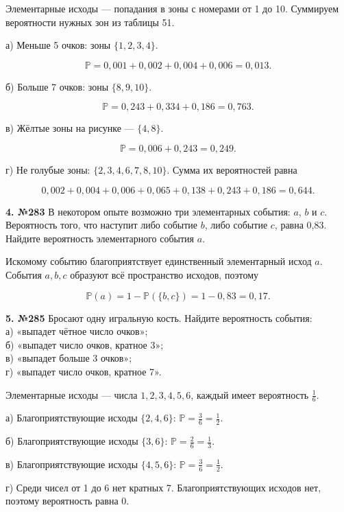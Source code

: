 \begin{solution}\label{solution-addition-of-probabilities-homework-3}
Элементарные исходы — попадания в зоны с номерами от 1 до 10. Суммируем вероятности нужных зон из таблицы 51.

а) Меньше 5 очков: зоны $\{1,2,3,4\}$.

\[\mathbb P=0,001+0,002+0,004+0,006=0,013.\]

б) Больше 7 очков: зоны $\{8,9,10\}$.

\[\mathbb P=0,243+0,334+0,186=0,763.\]

в) Жёлтые зоны на рисунке — $\{4,8\}$.

\[\mathbb P=0,006+0,243=0,249.\]

г) Не голубые зоны: $\{2,3,4,6,7,8,10\}$. Сумма их вероятностей равна

\[0,002+0,004+0,006+0,065+0,138+0,243+0,186=0,644.\]
\end{solution}

\begin{task}\label{task-homework-4}
\textbf{4. №283} В некотором опыте возможно три элементарных события: $a$, $b$ и $c$. Вероятность того, что наступит либо событие $b$, либо событие $c$, равна 0,83. Найдите вероятность элементарного события $a$.
\end{task}

\begin{solution}\label{solution-addition-of-probabilities-homework-4}
Искомому событию благоприятствует единственный элементарный исход $a$. События $a,b,c$ образуют всё пространство исходов, поэтому

\[\mathbb P(a)=1-\mathbb P(\{b,c\})=1-0,83=0,17.\]
\end{solution}

\begin{task}\label{task-homework-5}
\textbf{5. №285} Бросают одну игральную кость. Найдите вероятность события:\\
 а) «выпадет чётное число очков»;\\
 б) «выпадет число очков, кратное 3»;\\
 в) «выпадет больше 3 очков»;\\
 г) «выпадет число очков, кратное 7».
\end{task}

\begin{solution}\label{solution-addition-of-probabilities-homework-5}
Элементарные исходы — числа $1,2,3,4,5,6$, каждый имеет вероятность $\frac16$.

а) Благоприятствующие исходы $\{2,4,6\}$: $\mathbb P=\frac36=\frac12$.

б) Благоприятствующие исходы $\{3,6\}$: $\mathbb P=\frac26=\frac13$.

в) Благоприятствующие исходы $\{4,5,6\}$: $\mathbb P=\frac36=\frac12$.

г) Среди чисел от 1 до 6 нет кратных 7. Благоприятствующих исходов нет, поэтому вероятность равна 0.
\end{solution}

